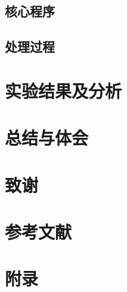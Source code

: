 \documentclass{ctexart}
\begin{document}
\subsection{核心程序}
\subsection{处理过程}
\section{实验结果及分析}
\section{总结与体会}
\section{致谢}
\section{参考文献}
\section{附录}
\end{document}
